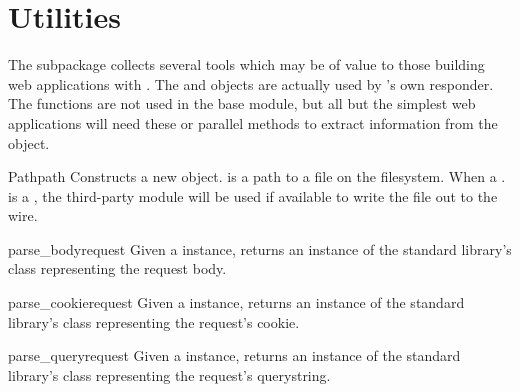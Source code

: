 \section{Utilities \label{utilities}}

The  subpackage collects several tools which may be of
value to those building web applications with . The 
and  objects are actually used by 's own
 responder. The  functions are not used in the
base module, but all but the simplest web applications will need these or
parallel methods to extract information from the  object.


\begin{classdesc}{Path}{path}
Constructs a new  object.  is a path to a file on the
filesystem. When a . is a , the
third-party
module will be used if available to write the file out to the wire.
\end{classdesc}



\begin{funcdesc}{parse_body}{request}
Given a  instance, returns an instance of the standard library's
 class
representing the request body.
\end{funcdesc}

\begin{funcdesc}{parse_cookie}{request}
Given a  instance, returns an instance of the standard library's
 class
representing the request's cookie.
\end{funcdesc}

\begin{funcdesc}{parse_query}{request}
Given a  instance, returns an instance of the standard library's
 class
representing the request's querystring.
\end{funcdesc}



